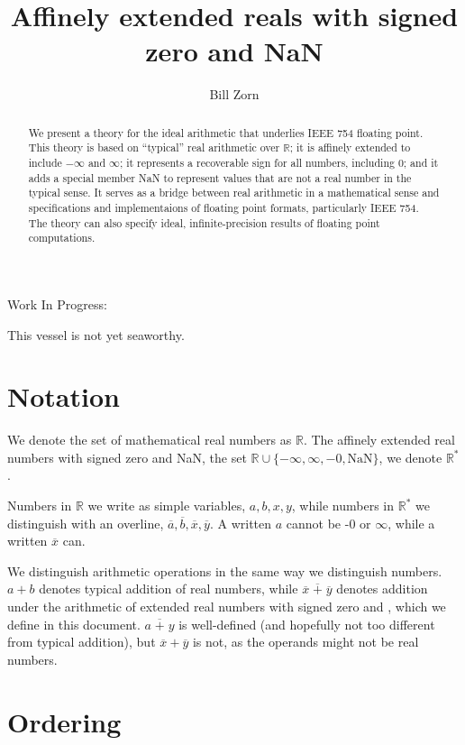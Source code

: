 \documentclass[letterpaper,10pt]{article}
\title{Affinely extended reals with signed zero and NaN}
\author{Bill Zorn}
\newcommand{\NaN}{\text{NaN}}
\begin{document}
\maketitle

\begin{abstract}
 We present a theory for the ideal arithmetic that underlies IEEE 754 floating point. This theory is based on ``typical'' real arithmetic over $\mathbb{R}$; it is affinely extended to include $-\infty$ and $\infty$; it represents a recoverable sign for all numbers, including 0; and it adds a special member NaN to represent values that are not a real number in the typical sense. It serves as a bridge between real arithmetic in a mathematical sense and specifications and implementaions of floating point formats, particularly IEEE 754. The theory can also specify ideal, infinite-precision results of floating point computations.
\end{abstract}

\begin{center}
 \huge \color{red} Work In Progress:

\large This vessel is not yet seaworthy.
\normalsize \normalcolor
\end{center}

\section{Notation}

 We denote the set of mathematical real numbers as $\mathbb{R}$. The affinely extended real numbers with signed zero and NaN, the set $\mathbb{R} \cup \{-\infty, \infty, -0, \NaN\}$, we denote $\mathbb{R}^*$.
 
 Numbers in $\mathbb{R}$ we write as simple variables, $a, b, x, y$, while numbers in $\mathbb{R}^*$ we distinguish with an overline, $\overline{a}, \overline{b}, \overline{x}, \overline{y}$. A written $a$ cannot be -0 or $\infty$, while a written $\overline{x}$ can.
 
 We distinguish arithmetic operations in the same way we distinguish numbers. $a + b$ denotes typical addition of real numbers, while $\overline{x} \;\overline{+}\; \overline{y}$ denotes addition under the arithmetic of extended real numbers with signed zero and \NaN, which we define in this document. $a \;\overline{+}\; y$ is well-defined (and hopefully not too different from typical addition), but $\overline{x} + \overline{y}$ is not, as the operands might not be real numbers.
 
\section{Ordering}
 
\end{document}
